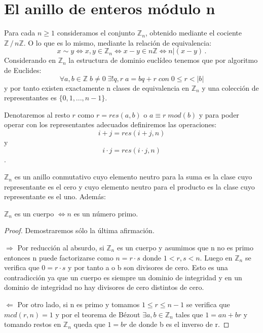 \section{El anillo de enteros módulo n}

Para cada $n \ge 1$ consideramos el conjunto $\mathbb{Z}_n$, obtenido mediante el cociente $\mathbb{Z}\,/\,n\mathbb{Z}$. O lo que es lo mismo, mediante la relación de equivalencia:
\begin{equation*}
	x \sim y \iff x,y \in \mathbb{Z}_n \iff x-y \in n\mathbb{Z} \iff n | (x-y)\,.
\end{equation*}
Considerando en $\mathbb{Z}_n$ la estructura de dominio euclídeo tenemos que por algoritmo de Euclides: $$\forall a,b \in \mathbb{Z} \; b \neq 0 \; \exists! q,r \; a = bq+r \; con \; 0 \leq r < |b| $$ y por tanto existen exactamente n clases de equivalencia en $\mathbb{Z}_n$ y una colección de representantes es $\{0,1,...,n-1\}$.

Denotaremos al resto $r$ como $r = res(a,b)$ o $a \equiv r \; mod(b)$ y para poder operar con los representantes adecuados definiremos las operaciones: $$i+j = res(i+j,n)$$ y $$i \cdot j = res(i \cdot j,n)$$.

\begin{nprop}
$\mathbb{Z}_n$ es un anillo conmutativo cuyo elemento neutro para la suma es la clase cuyo representante es el cero y cuyo elemento neutro para el producto es la clase cuyo representante es el uno. Además:

$\mathbb{Z}_n$ es un cuerpo $\iff n$ es un número primo.
\end{nprop}

\begin{proof}

Demostraremos sólo la última afirmación. 

$\Rightarrow$ Por reducción al absurdo, si $\mathbb{Z}_n$ es un cuerpo y asumimos que n no es primo entonces n puede factorizarse como $n = r \cdot s$ donde $1 < r,s < n$. Luego en $\mathbb{Z}_n$ se verifica que $0 = r \cdot s$ y por tanto a o b son divisores de cero. Esto es una contradicción ya que un cuerpo es siempre un dominio de integridad y en un dominio de integridad no hay divisores de cero distintos de cero.

$\Leftarrow$ Por otro lado, si n es primo y tomamos $1 \leq r \leq n-1$ se verifica que $mcd(r,n) = 1$ y por el teorema de Bézout $\exists a,b \in \mathbb{Z}_n$ tales que $1 = an + br$ y tomando restos en $\mathbb{Z}_n$ queda que $1 = br$ de donde b es el inverso de r.

\end{proof}

